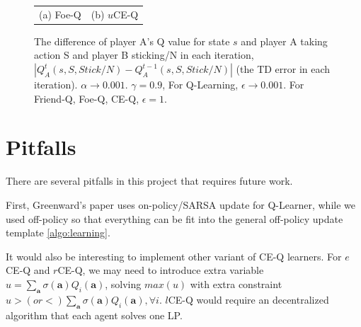 \documentclass[conference]{IEEEtran}
\begin{document}
\begin{figure}[h!]
\begin{tabular}{cc}
		(a) Foe-Q & (b) $u$CE-Q \\
	\end{tabular}
	\caption{The difference of player A's Q value for state $s$ and player A taking action S and player B sticking/N in each iteration, $|Q_A^t(s, S, Stick/N) - Q_A^{t-1}(s, S, Stick/N)|$ (the TD error in each iteration). $\alpha\rightarrow0.001$. $\gamma=0.9$, For Q-Learning, $\epsilon\rightarrow0.001$. For Friend-Q, Foe-Q, CE-Q, $\epsilon=1$. }
	\label{fig:results}
\end{figure}

\section{Pitfalls}
There are several pitfalls in this project that requires future work.

First, Greenward's paper uses on-policy/SARSA update for Q-Learner, while we used off-policy so that everything can be fit into the general off-policy update template \ref{algo:learning}.

It would also be interesting to implement other variant of CE-Q learners. For $e$CE-Q and $r$CE-Q, we may need to introduce extra variable $u=\sum_{\mathbf{a}}\sigma(\mathbf{a}) Q_i(\mathbf{a})$, solving $max(u)$ with extra constraint $u>(or <) \sum_{\mathbf{a}}\sigma(\mathbf{a}) Q_i(\mathbf{a}), \forall i$. $l$CE-Q would require an decentralized algorithm that each agent solves one LP.

	


\end{document}
